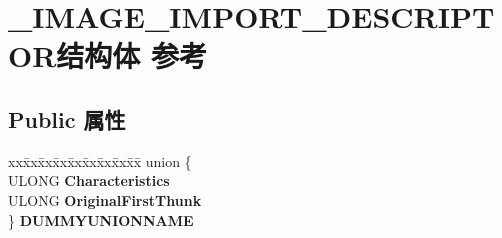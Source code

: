 \hypertarget{struct___i_m_a_g_e___i_m_p_o_r_t___d_e_s_c_r_i_p_t_o_r}{}\section{\+\_\+\+I\+M\+A\+G\+E\+\_\+\+I\+M\+P\+O\+R\+T\+\_\+\+D\+E\+S\+C\+R\+I\+P\+T\+O\+R结构体 参考}
\label{struct___i_m_a_g_e___i_m_p_o_r_t___d_e_s_c_r_i_p_t_o_r}
\subsection*{Public 属性}
\begin{DoxyCompactItemize}
\item 
\mbox{\label{struct___i_m_a_g_e___i_m_p_o_r_t___d_e_s_c_r_i_p_t_o_r_a98ab43f0018856455910b793fbff45e6}} 
\begin{tabbing}
xx\=xx\=xx\=xx\=xx\=xx\=xx\=xx\=xx\=\kill
union \{\\
\>ULONG {\bfseries Characteristics}\\
\>ULONG {\bfseries OriginalFirstThunk}\\
\} {\bfseries DUMMYUNIONNAME}\\


\end{tabbing}
\end{DoxyCompactItemize}
